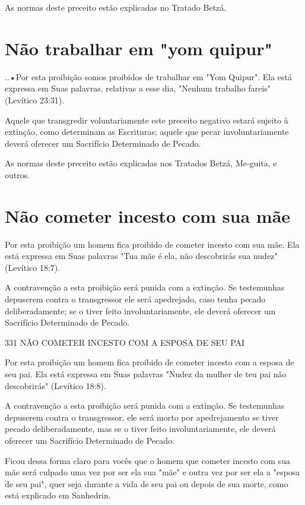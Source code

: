 \begin{itemize}
\begin{enumrate}
\begin{itemize}
\begin{itemize}
\begin{itemize}
As normas deste preceito estão explicadas no Tratado Betzá.


\section{Não trabalhar em "yom quipur"}


..•Por esta proibição somos proibidos de trabalhar em
"Yom Quipur". Ela está expressa em Suas palavras, relativas a esse dia,
"Nenhum trabalho fa­reis" (Levítico 23:31).

Aquele que transgredir voluntariamente este preceito negativo esta­rá
sujeito à extinção, como determinam as Escrituras; aquele que pecar
invo­luntariamente deverá oferecer um Sacrifício Determinado de Pecado.

As normas deste preceito estão explicadas nos Tratados Betzá, Me-guita,
e outros.

\section{Não cometer incesto com sua mãe}

Por esta proibição um homem fica proibido de cometer incesto com sua
mãe. Ela está expressa em Suas palavras "Tua mãe é ela, não descobrirás
sua nudez" (Levítico 18:7).

A contravenção a esta proibição será punida com a extinção. Se
tes­temunhas depuserem contra o transgressor ele será apedrejado, caso
tenha pe­cado deliberadamente; se o tiver feito involuntariamente, ele
deverá oferecer um Sacrifício Determinado de Pecado.

331 NÃO COMETER INCESTO COM A ESPOSA DE SEU PAI

Por esta proibição um homem fica proibido de cometer incesto com a
esposa de seu pai. Ela está expressa em Suas palavras "Nudez da mulher
de teu pai não descobrirás" (Levítico 18:8).

A contravenção a esta proibição será punida com a extinção. Se
tes­temunhas depuserem contra o transgressor, ele será morto por
apedrejamento se tiver pecado deliberadamente, mas se o tiver feito
involuntariamente, ele de­verá oferecer um Sacrifício Determinado de
Pecado.

Ficou dessa forma claro para vocês que o homem que cometer in­cesto com
sua mãe será culpado uma vez por ser ela sua "mãe" e outra vez por ser
ela a "esposa de seu pai", quer seja durante a vida de seu pai ou depois
de sua morte, como está explicado em Sanhedrin.


\end{itemize}
\end{itemize}
\end{itemize}
\end{enumrate}
\end{itemize}
